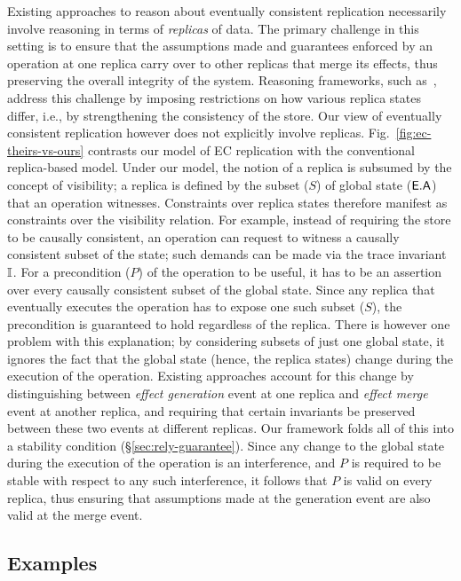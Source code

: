 Existing approaches to reason about eventually consistent replication
necessarily involve reasoning in terms of \emph{replicas} of data. The
primary challenge in this setting is to ensure that the assumptions
made and guarantees enforced by an operation at one replica carry over
to other replicas that merge its effects, thus preserving the overall
integrity of the system. Reasoning frameworks, such
as~\cite{gotsmanpopl16}, address this challenge by imposing
restrictions on how various replica states differ, i.e., by
strengthening the consistency of the store. Our view of eventually
consistent replication however does not explicitly involve replicas.
Fig.~\ref{fig:ec-theirs-vs-ours} contrasts our model of EC replication
with the conventional replica-based model.  Under our model, the
notion of a replica is subsumed by the concept of visibility; a
replica is defined by the subset ($S$) of global state ($\textsf{E}.\textsf{A}$) that
an operation witnesses.  Constraints over replica states therefore
manifest as constraints over the visibility relation. For example,
instead of requiring the store to be causally consistent, an operation
can request to witness a causally consistent subset of the state; such
demands can be made via the trace invariant $\mathbb{I}$. For a precondition
($P$) of the operation to be useful, it has to be an assertion over
every causally consistent subset of the global state. Since any
replica that eventually executes the operation has to expose one such
subset ($S$), the precondition is guaranteed to hold regardless of the
replica. There is however one problem with this explanation; by
considering subsets of just one global state, it ignores the fact that
the global state (hence, the replica states) change during the
execution of the operation. Existing approaches account for this
change by distinguishing between \emph{effect generation} event at one
replica and \emph{effect merge} event at another replica, and
requiring that certain invariants be preserved between these two
events at different replicas. Our framework folds all of this into a
stability condition (\S\ref{sec:rely-guarantee}). Since any change to
the global state during the execution of the operation is an
interference, and $P$ is required to be stable with respect to any
such interference, it follows that $P$ is valid on every replica, thus
ensuring that assumptions made at the generation event are also valid
at the merge event.

\subsection{Examples}

